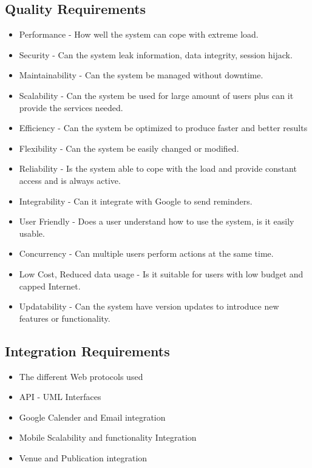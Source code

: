 \documentclass[a4paper]{article}
\begin{document}
	\subsection{Quality Requirements}
	\begin{itemize}
		\item Performance - How well the system can cope with extreme load.
		\item Security - Can the system leak information, data integrity, session hijack.
		\item Maintainability - Can the system be managed without downtime.
		\item Scalability - Can the system be used for large amount of users plus can it provide the services needed.
		\item Efficiency - Can the system be optimized to produce faster and better results
		\item Flexibility - Can the system be easily changed or modified.
		\item Reliability - Is the system able to cope with the load and provide constant access and is always active.
		\item Integrability - Can it integrate with Google to send reminders.
		\item User Friendly - Does a user understand how to use the system, is it easily usable.
		\item Concurrency - Can multiple users perform actions at the same time.
		\item Low Cost, Reduced data usage - Is it suitable for users with low budget and capped Internet.
		\item Updatability - Can the system have version updates to introduce new features or functionality.
		\\
	\end{itemize}
	
	\subsection{Integration Requirements}
	\begin{itemize}
		\item The different Web protocols used 
		\item API - UML Interfaces
		\item Google Calender and Email integration
		\item Mobile Scalability and functionality Integration
		\item Venue and Publication integration
		\\
	\end{itemize}
	
\end{document}

